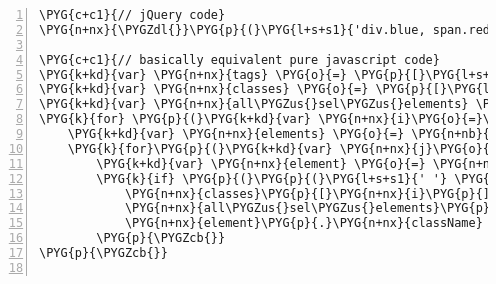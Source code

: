\begin{Verbatim}[commandchars=\\\{\},numbers=left,stepnumber=1,codes={\catcode`\$=3\catcode`\^=7\catcode`\_=8}]
\PYG{c+c1}{// jQuery code}
\PYG{n+nx}{\PYGZdl{}}\PYG{p}{(}\PYG{l+s+s1}{'div.blue, span.red'}\PYG{p}{)}\PYG{p}{.}\PYG{n+nx}{addClass}\PYG{p}{(}\PYG{l+s+s1}{'bold'}\PYG{p}{)}\PYG{p}{.}\PYG{n+nx}{fadeIn}\PYG{p}{(}\PYG{l+m+mi}{500}\PYG{p}{)}\PYG{p}{;}

\PYG{c+c1}{// basically equivalent pure javascript code}
\PYG{k+kd}{var} \PYG{n+nx}{tags} \PYG{o}{=} \PYG{p}{[}\PYG{l+s+s1}{'div'}\PYG{p}{,} \PYG{l+s+s1}{'span'}\PYG{p}{]}\PYG{p}{;}
\PYG{k+kd}{var} \PYG{n+nx}{classes} \PYG{o}{=} \PYG{p}{[}\PYG{l+s+s1}{'blue'}\PYG{p}{,} \PYG{l+s+s1}{'red'}\PYG{p}{]}\PYG{p}{;}
\PYG{k+kd}{var} \PYG{n+nx}{all\PYGZus{}sel\PYGZus{}elements} \PYG{o}{=} \PYG{p}{[}\PYG{p}{]}\PYG{p}{;}
\PYG{k}{for} \PYG{p}{(}\PYG{k+kd}{var} \PYG{n+nx}{i}\PYG{o}{=}\PYG{l+m+mi}{0}\PYG{p}{;} \PYG{n+nx}{i}\PYG{o}{<}\PYG{n+nx}{tags}\PYG{p}{.}\PYG{n+nx}{length}\PYG{p}{;} \PYG{n+nx}{i}\PYG{o}{++}\PYG{p}{)} \PYG{p}{\PYGZob{}}
    \PYG{k+kd}{var} \PYG{n+nx}{elements} \PYG{o}{=} \PYG{n+nb}{document}\PYG{p}{.}\PYG{n+nx}{getElementsByTagName}\PYG{p}{(}\PYG{n+nx}{tags}\PYG{p}{[}\PYG{n+nx}{i}\PYG{p}{]}\PYG{p}{)}\PYG{p}{;}
    \PYG{k}{for}\PYG{p}{(}\PYG{k+kd}{var} \PYG{n+nx}{j}\PYG{o}{=}\PYG{l+m+mi}{0}\PYG{p}{;} \PYG{n+nx}{j}\PYG{o}{<}\PYG{n+nx}{elements}\PYG{p}{.}\PYG{n+nx}{length}\PYG{p}{;} \PYG{n+nx}{j}\PYG{o}{++}\PYG{p}{)} \PYG{p}{\PYGZob{}}
        \PYG{k+kd}{var} \PYG{n+nx}{element} \PYG{o}{=} \PYG{n+nx}{elements}\PYG{p}{[}\PYG{n+nx}{j}\PYG{p}{]}\PYG{p}{;}
        \PYG{k}{if} \PYG{p}{(}\PYG{p}{(}\PYG{l+s+s1}{' '} \PYG{o}{+} \PYG{n+nx}{element}\PYG{p}{.}\PYG{n+nx}{className} \PYG{o}{+} \PYG{l+s+s1}{' '}\PYG{p}{)}\PYG{p}{.}\PYG{n+nx}{indexOf}\PYG{p}{(}\PYG{l+s+s1}{' '} \PYG{o}{+}
            \PYG{n+nx}{classes}\PYG{p}{[}\PYG{n+nx}{i}\PYG{p}{]} \PYG{o}{+} \PYG{l+s+s1}{' '}\PYG{p}{)} \PYG{o}{>} \PYG{o}{-}\PYG{l+m+mi}{1}\PYG{p}{)} \PYG{p}{\PYGZob{}}
            \PYG{n+nx}{all\PYGZus{}sel\PYGZus{}elements}\PYG{p}{.}\PYG{n+nx}{push}\PYG{p}{(}\PYG{n+nx}{element}\PYG{p}{)}\PYG{p}{;}
            \PYG{n+nx}{element}\PYG{p}{.}\PYG{n+nx}{className} \PYG{o}{+=} \PYG{l+s+s1}{' bold'}\PYG{p}{;}
        \PYG{p}{\PYGZcb{}}
\PYG{p}{\PYGZcb{}}


\end{Verbatim}
